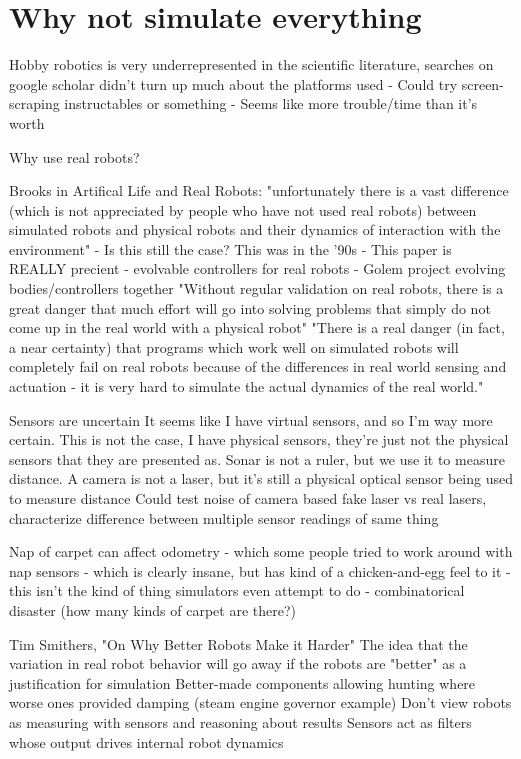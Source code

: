 \section{Why not simulate everything}

Hobby robotics is very underrepresented in the scientific literature, searches on google scholar didn't turn up much about the platforms used
	- Could try screen-scraping instructables or something
	- Seems like more trouble/time than it's worth

Why use real robots?

Brooks in Artifical Life and Real Robots: "unfortunately there is a vast difference (which is not appreciated by people who have not used real robots) between simulated robots and physical robots and their dynamics of interaction with the environment"
	- Is this still the case? This was in the '90s
	- This paper is REALLY precient
		- evolvable controllers for real robots
		- Golem project evolving bodies/controllers together
	"Without regular validation on real robots, there is a great danger that much effort will go into solving problems that simply do not come up in the real world with a physical robot"
	"There is a real danger (in fact, a near certainty) that programs which work well on simulated robots will completely fail on real robots because of the differences in real world sensing and actuation - it is very hard to simulate the actual dynamics of the real world."

	Sensors are uncertain
		It seems like I have virtual sensors, and so I'm way more certain. 
		This is not the case, I have physical sensors, they're just not the physical sensors that they are presented as. 
		Sonar is not a ruler, but we use it to measure distance. 
		A camera is not a laser, but it's still a physical optical sensor being used to measure distance
			Could test noise of camera based fake laser vs real lasers, characterize difference between multiple sensor readings of same thing

	Nap of carpet can affect odometry
		- which some people tried to work around with nap sensors
			- which is clearly insane, but has kind of a chicken-and-egg feel to it
		- this isn't the kind of thing simulators even attempt to do
			- combinatorical disaster (how many kinds of carpet are there?)

Tim Smithers, "On Why Better Robots Make it Harder"
	The idea that the variation in real robot behavior will go away if the robots are "better" as a justification for simulation
	Better-made components allowing hunting where worse ones provided damping (steam engine governor example)
	Don't view robots as measuring with sensors and reasoning about results
		Sensors act as filters whose output drives internal robot dynamics


